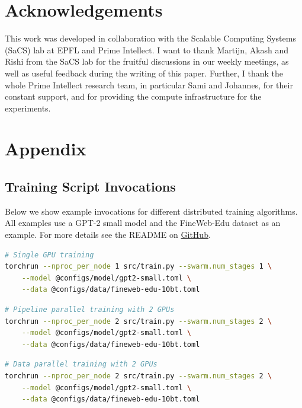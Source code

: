 \documentclass{article}
\newcommand{\github}{\href{https://github.com/mikasenghaas/diloco-swarm}{GitHub}}
\begin{document}
\section*{Acknowledgements}
\label{sec:acknowledgements}

This work was developed in collaboration with the Scalable Computing Systems
(SaCS) lab at EPFL and Prime Intellect. I want to thank Martijn, Akash and Rishi from the SaCS lab for the fruitful discussions in our weekly meetings, as well as useful feedback during the writing of this paper. Further, I thank the whole Prime Intellect research team, in particular Sami and Johannes, for their constant support, and for providing the compute infrastructure for the experiments.




\newpage
\appendix
\onecolumn

\section{Appendix}

\subsection{Training Script Invocations}

Below we show example invocations for different distributed training algorithms.
All examples use a GPT-2 small model and the FineWeb-Edu dataset as an example.
For more details see the README on \github.

\begin{lstlisting}[language=bash]
# Single GPU training
torchrun --nproc_per_node 1 src/train.py --swarm.num_stages 1 \
    --model @configs/model/gpt2-small.toml \
    --data @configs/data/fineweb-edu-10bt.toml
\end{lstlisting}

\begin{lstlisting}[language=bash]
# Pipeline parallel training with 2 GPUs
torchrun --nproc_per_node 2 src/train.py --swarm.num_stages 2 \
    --model @configs/model/gpt2-small.toml \
    --data @configs/data/fineweb-edu-10bt.toml
\end{lstlisting}

\begin{lstlisting}[language=bash]
# Data parallel training with 2 GPUs
torchrun --nproc_per_node 2 src/train.py --swarm.num_stages 2 \
    --model @configs/model/gpt2-small.toml \
    --data @configs/data/fineweb-edu-10bt.toml
\end{lstlisting}
\end{document}
